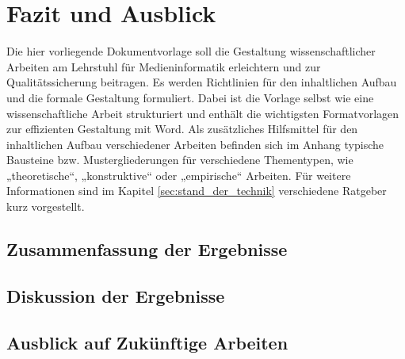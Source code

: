 \chapter{Fazit und Ausblick}\label{sec:Fazit}

Die hier vorliegende Dokumentvorlage soll die Gestaltung wissenschaftlicher Arbeiten am Lehrstuhl für Medieninformatik erleichtern und zur Qualitätssicherung beitragen. Es werden Richtlinien für den inhaltlichen Aufbau und die formale Gestaltung formuliert. Dabei ist die Vorlage selbst wie eine wissenschaftliche Arbeit strukturiert und enthält die wichtigsten Formatvorlagen zur effizienten Gestaltung mit Word. Als zusätzliches Hilfsmittel für den inhaltlichen Aufbau verschiedener Arbeiten befinden sich im Anhang typische Bausteine bzw. Mustergliederungen für verschiedene Thementypen, wie „theoretische“, „konstruktive“ oder „empirische“ Arbeiten. Für weitere Informationen sind im Kapitel \ref{sec:stand_der_technik} verschiedene Ratgeber kurz vorgestellt. 

\section{Zusammenfassung der Ergebnisse}

\section{Diskussion der Ergebnisse}

\section{Ausblick auf Zukünftige Arbeiten}

